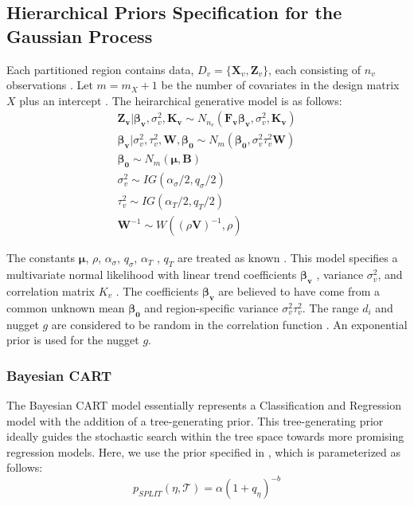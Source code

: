 \documentclass{article}\usepackage[]{graphicx}\usepackage[]{color}
\begin{document}
\subsection*{Hierarchical Priors Specification for the Gaussian Process}

Each partitioned region contains data, $D_v = \{\boldsymbol{X}_v, \boldsymbol{Z}_v\}$, each consisting of $n_v$ observations \cite{gramacy_lee_2008}.
Let $m = m_{X} + 1$ be the number of covariates in the design matrix $X$ plus an intercept \cite{gramacy_lee_2008}. The heirarchical generative model is as follows:
\begin{equation}
\label{eq:2}
\begin{aligned}
\boldsymbol{Z_v}|\boldsymbol{\beta_v}, \sigma_v^2, \boldsymbol{K_v} \sim N_{n_v}(\boldsymbol{F_v}\boldsymbol{\beta_v}, \sigma_v^2, \boldsymbol{K_v})
\\
\boldsymbol{\beta_v}|\sigma_v^2, \tau_v^2, \boldsymbol{W}, \boldsymbol{\beta_0} \sim N_m(\boldsymbol{\beta_0}, \sigma_v^2 \tau_v^2\boldsymbol{W})
\\
\boldsymbol{\beta_0} \sim N_m(\boldsymbol{\mu}, \boldsymbol{B})
\\
\sigma_v^2 \sim IG(\alpha_{\sigma}/2, q_{\sigma}/2)
\\
\tau_v^2 \sim IG(\alpha_{T}/2, q_{T}/2)
\\
\boldsymbol{W}^{-1} \sim W((\rho\boldsymbol{V})^{-1}, \rho)
\end{aligned}
\end{equation}

The constants $\boldsymbol{\mu}$, $\rho$, $\alpha_{\sigma}$, $q_{\sigma}$, $\alpha_{T}$ , $q_{T}$ are treated as known \cite{gramacy_lee_2008}. This model specifies a multivariate normal likelihood with linear trend coefficients $\boldsymbol{\beta_v}$ , variance $\sigma_v^2$, and correlation matrix $K_v$ \cite{gramacy_lee_2008}. The coefficients $\boldsymbol{\beta_v}$ are believed to have come from a common unknown mean $\boldsymbol{\beta_0}$ and region-specific variance $\sigma_v^2 \tau_v^2$. The range $d_i$ and nugget $g$ are considered to be random in the correlation function \cite{gramacy_lee_2008}. An exponential prior is used for the nugget $g$. 

\subsubsection*{Bayesian CART}

The Bayesian CART model essentially represents a Classification and Regression model with the addition of a tree-generating prior. This tree-generating prior ideally guides the stochastic search within the tree space towards more promising regression models. Here, we use the prior specified in \cite{chipman_1998}, which is parameterized as follows: 
\begin{equation}
p_{SPLIT}(\eta, \mathcal{T})= \alpha(1+q_{\eta})^{-b}    
\end{equation}
\end{document}
